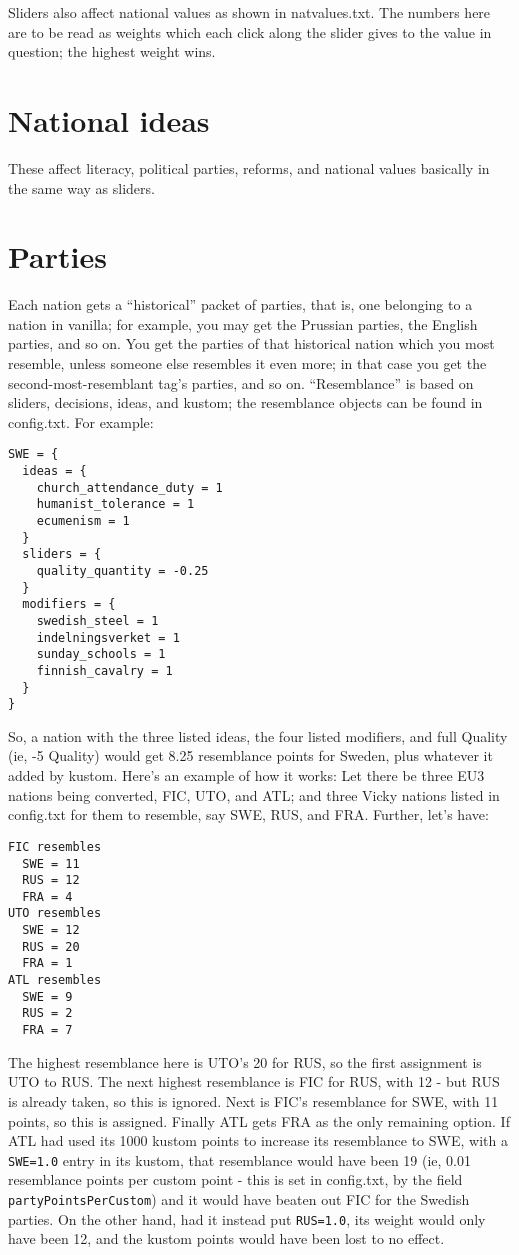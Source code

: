 \documentclass[12pt]{article}
\begin{document}
Sliders also affect national values as shown in natvalues.txt. The
numbers here are to be read as weights which each click along the
slider gives to the value in question; the highest weight wins. 

\section{National ideas}

These affect literacy, political parties, reforms, and national values
basically in the same way as sliders. 

\section{Parties}

Each nation gets a ``historical'' packet of parties, that is, one
belonging to a nation in vanilla; for example, you may get the
Prussian parties, the English parties, and so on. You get the parties
of that historical nation which you most resemble, unless someone else
resembles it even more; in that case you get the
second-most-resemblant tag's parties, and so on. ``Resemblance'' is
based on sliders, decisions, ideas, and kustom; the resemblance
objects can be found in config.txt. For example:


\begin{verbatim}
SWE = {
  ideas = {
    church_attendance_duty = 1
    humanist_tolerance = 1
    ecumenism = 1
  }
  sliders = {
    quality_quantity = -0.25
  }
  modifiers = {
    swedish_steel = 1
    indelningsverket = 1
    sunday_schools = 1
    finnish_cavalry = 1
  }
}
\end{verbatim}

So, a nation with the three listed ideas, the four listed modifiers,
and full Quality (ie, -5 Quality) would get 8.25 resemblance points
for Sweden, plus whatever it added by kustom. Here's an example of how
it works: Let there be three EU3 nations being converted, FIC, UTO,
and ATL; and three Vicky nations listed in config.txt for them to
resemble, say SWE, RUS, and FRA. Further, let's have:

\begin{verbatim}
FIC resembles 
  SWE = 11
  RUS = 12
  FRA = 4
UTO resembles
  SWE = 12
  RUS = 20
  FRA = 1
ATL resembles
  SWE = 9
  RUS = 2
  FRA = 7
\end{verbatim}

The highest resemblance here is UTO's 20 for RUS, so the first
assignment is UTO to RUS. The next highest resemblance is FIC for RUS,
with 12 - but RUS is already taken, so this is ignored. Next is FIC's
resemblance for SWE, with 11 points, so this is assigned. Finally ATL
gets FRA as the only remaining option. If ATL had used its 1000 kustom
points to increase its resemblance to SWE, with a \verb|SWE=1.0| entry in
its kustom, that resemblance would have been 19 (ie, 0.01 resemblance
points per custom point - this is set in config.txt, by the field
\verb|partyPointsPerCustom|)
and it would have beaten out FIC for the Swedish parties. On the other hand, had it
instead put \verb|RUS=1.0|, its weight would only have been 12, and the
kustom points would have been lost to no effect. 
\end{document}
